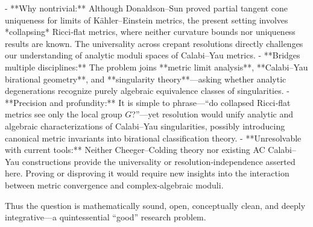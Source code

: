 - **Why nontrivial:** Although Donaldson–Sun proved partial tangent cone uniqueness for limits of Kähler–Einstein metrics, the present setting involves *collapsing* Ricci‑flat metrics, where neither curvature bounds nor uniqueness results are known. The universality across crepant resolutions directly challenges our understanding of analytic moduli spaces of Calabi–Yau metrics.  
- **Bridges multiple disciplines:** The problem joins **metric limit analysis**, **Calabi–Yau birational geometry**, and **singularity theory**—asking whether analytic degenerations recognize purely algebraic equivalence classes of singularities.  
- **Precision and profundity:** It is simple to phrase—“do collapsed Ricci‑flat metrics see only the local group \(G\)?”—yet resolution would unify analytic and algebraic characterizations of Calabi–Yau singularities, possibly introducing canonical metric invariants into birational classification theory.  
- **Unresolvable with current tools:** Neither Cheeger–Colding theory nor existing AC Calabi–Yau constructions provide the universality or resolution‑independence asserted here. Proving or disproving it would require new insights into the interaction between metric convergence and complex‑algebraic moduli.  

Thus the question is mathematically sound, open, conceptually clean, and deeply integrative—a quintessential “good” research problem.